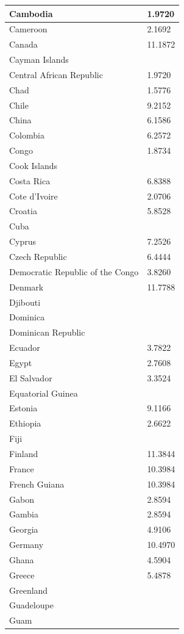 \documentclass[12pt]{article}
\begin{document}
\begin{longtable}{|p{}|p{}|}
Cambodia&1.9720 \\\hline
Cameroon&2.1692 \\\hline
Canada&11.1872 \\\hline
Cayman Islands& \\\hline
Central African Republic&1.9720 \\\hline
Chad&1.5776 \\\hline
Chile&9.2152 \\\hline
China&6.1586 \\\hline
Colombia&6.2572 \\\hline
Congo&1.8734 \\\hline
Cook Islands& \\\hline
Costa Rica&6.8388 \\\hline
Cote d'Ivoire&2.0706 \\\hline
Croatia&5.8528 \\\hline
Cuba& \\\hline
Cyprus&7.2526 \\\hline
Czech Republic&6.4444 \\\hline
Democratic Republic of the Congo&3.8260 \\\hline
Denmark&11.7788 \\\hline
Djibouti& \\\hline
Dominica& \\\hline
Dominican Republic& \\\hline
Ecuador&3.7822 \\\hline
Egypt&2.7608 \\\hline
El Salvador&3.3524 \\\hline
Equatorial Guinea& \\\hline
Estonia&9.1166 \\\hline
Ethiopia&2.6622 \\\hline
Fiji& \\\hline
Finland&11.3844 \\\hline
France&10.3984 \\\hline
French Guiana&10.3984 \\\hline
Gabon&2.8594 \\\hline
Gambia&2.8594 \\\hline
Georgia&4.9106 \\\hline
Germany&10.4970 \\\hline
Ghana&4.5904 \\\hline
Greece&5.4878 \\\hline
Greenland& \\\hline
Guadeloupe& \\\hline
Guam& \\\hline

\end{longtable}
\end{document}
